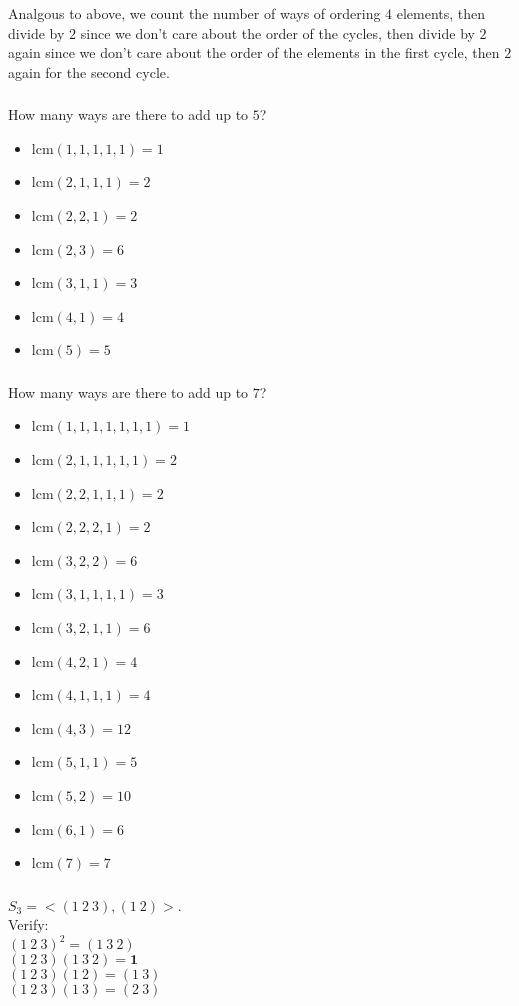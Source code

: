 \documentclass{article}
\newcommand{\id}{ \bm{1} }
\begin{document}
\subsubsection{}\label{ex3p17}
Analgous to above, we count the number of ways of ordering $4$ elements, then divide by $2$ since we don't care about the order of the cycles, then divide by $2$ again since we don't care about the order of the elements in the first cycle, then $2$ again for the second cycle.
\subsubsection{}\label{ex3p18}
How many ways are there to add up to $5$?
\begin{itemize}
\item lcm$(1,1,1,1,1) = 1$
\item lcm$(2,1,1,1) = 2$
\item lcm$(2,2,1) = 2$
\item lcm$(2,3) = 6$
\item lcm$(3,1,1) = 3$
\item lcm$(4,1) = 4$
\item lcm$(5) = 5$
\end{itemize}
\subsubsection{}\label{ex3p19}
How many ways are there to add up to $7$?
\begin{itemize}
\item lcm$(1,1,1,1,1,1,1) = 1$
\item lcm$(2,1,1,1,1,1) = 2$
\item lcm$(2,2,1,1,1) = 2$
\item lcm$(2,2,2,1) = 2$
\item lcm$(3,2,2) = 6$
\item lcm$(3,1,1,1,1) = 3$
\item lcm$(3,2,1,1) = 6$
\item lcm$(4,2,1) = 4$
\item lcm$(4,1,1,1) = 4$
\item lcm$(4,3) = 12$
\item lcm$(5,1,1) = 5$
\item lcm$(5,2) = 10$
\item lcm$(6,1) = 6$
\item lcm$(7) = 7$
\end{itemize}
\subsubsection{}\label{ex3p20}
$S_3 = <(1\ 2\ 3), (1\ 2)>$.\\ Verify:\\
$(1\ 2\ 3)^2 = (1\ 3\ 2)$\\
$(1\ 2\ 3)(1\ 3\ 2) = \id$\\
$(1\ 2\ 3)(1\ 2) = (1\ 3)$\\
$(1\ 2\ 3)(1\ 3) = (2\ 3)$
\end{document}
